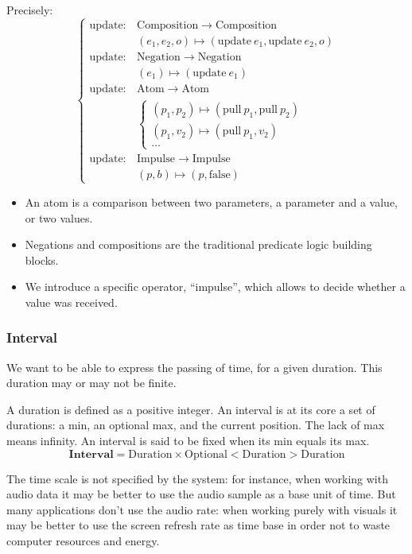 \documentclass[a4paper]{article}
\newcommand\mg[1]{\ensuremath{ {\boldsymbol<} #1 {\boldsymbol>} }}
\begin{document}
Precisely:
\[
\begin{cases}
\mathrm{update} : & \mathrm{Composition} \rightarrow \mathrm{Composition} \\ 
& (e_1, e_2, o) \mapsto (\mathrm{update}~e_1, \mathrm{update}~e_2, o) \\
\mathrm{update} : & \mathrm{Negation} \rightarrow \mathrm{Negation} \\
&  (e_1) \mapsto (\mathrm{update}~ e_1) \\
\mathrm{update} :&  \mathrm{Atom} \rightarrow \mathrm{Atom} \\
& \begin{cases}
(p_1, p_2) \mapsto (\mathrm{pull}~p_1, \mathrm{pull}~p_2) \\
(p_1, v_2) \mapsto (\mathrm{pull}~p_1, v_2) \\ 
\dots
\end{cases}\\
\mathrm{update} : & \mathrm{Impulse} \rightarrow \mathrm{Impulse} \\
& (p, b) \mapsto (p, \mathrm{false})
\end{cases}
\] 


\begin{itemize}
    \item An atom is a comparison between two parameters, a parameter and a value, or two values.
    \item Negations and compositions are the traditional predicate logic building blocks.
    \item We introduce a specific operator, ``impulse'', which allows to decide whether a value was received.
\end{itemize}

\subsubsection{Interval}
We want to be able to express the passing of time, for a given duration.
This duration may or may not be finite.

A duration is defined as a positive integer.
An interval is at its core a set of durations: a min, an optional max, and the current position. 
The lack of max means infinity.
An interval is said to be fixed when its min equals its max.
\[
\mathbf{Interval} = \mathrm{Duration} \times \mathrm{Optional\mg{Duration}} \mathrm{Duration}
\]

The time scale is not specified by the system: for instance, when working with audio data it may be better to use the audio sample as a base unit of time.
But many applications don't use the audio rate: when working purely with visuals it may be better to use the screen refresh rate as time base in order not to 
waste computer resources and energy.
\end{document}
